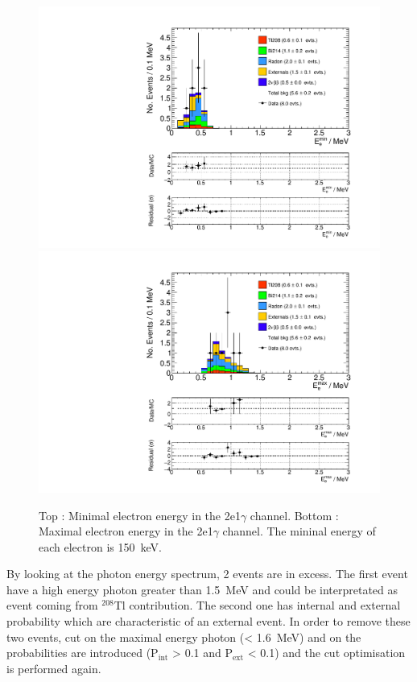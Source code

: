 \documentclass[main.tex]{subfiles}
\begin{document}
\begin{figure} [h!]
\begin{center}
\includegraphics[scale=0.35]{pictures/FinalResults/bb0nu2/150/Eemin_bb0nu2NS.pdf}
\includegraphics[scale=0.35]{pictures/FinalResults/bb0nu2/150/Eemax_bb0nu2NS.pdf}
\end{center}
\caption{Top : Minimal electron energy in the 2e1$\gamma$ channel. Bottom : Maximal electron energy in the 2e1$\gamma$ channel. The mininal energy of each electron is 150~keV.}
\label{plot:EeminAndEemax250bb0nu2}
\end{figure}


\NI By looking at the photon energy spectrum, 2 events are in excess. The first event have a high energy photon greater than 1.5~MeV and could be interpretated as event coming from $^{\text{208}}$Tl contribution. The second one has internal and external probability which are characteristic of an external event. In order to remove these two events, cut on the maximal energy photon (< 1.6~MeV) and on the probabilities are introduced (P$_\text{int}$ > 0.1 and P$_\text{ext}$ < 0.1) and the cut optimisation is performed again.
\end{document}
